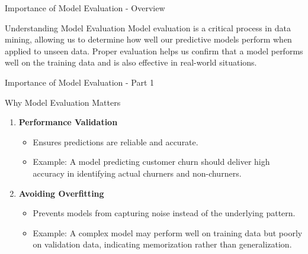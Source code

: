\documentclass[aspectratio=169]{beamer}
\begin{document}
\begin{frame}[fragile]{Importance of Model Evaluation - Overview}
    \begin{block}{Understanding Model Evaluation}
        Model evaluation is a critical process in data mining, allowing us to determine how well our predictive models perform when applied to unseen data. Proper evaluation helps us confirm that a model performs well on the training data and is also effective in real-world situations.
    \end{block}
\end{frame}

\begin{frame}[fragile]{Importance of Model Evaluation - Part 1}
    \begin{block}{Why Model Evaluation Matters}
        \begin{enumerate}
            \item \textbf{Performance Validation}
            \begin{itemize}
                \item Ensures predictions are reliable and accurate.
                \item Example: A model predicting customer churn should deliver high accuracy in identifying actual churners and non-churners.
            \end{itemize}

            \item \textbf{Avoiding Overfitting}
            \begin{itemize}
                \item Prevents models from capturing noise instead of the underlying pattern.
                \item Example: A complex model may perform well on training data but poorly on validation data, indicating memorization rather than generalization.
            \end{itemize}
        \end{enumerate}
    \end{block}
\end{frame}
\end{document}
